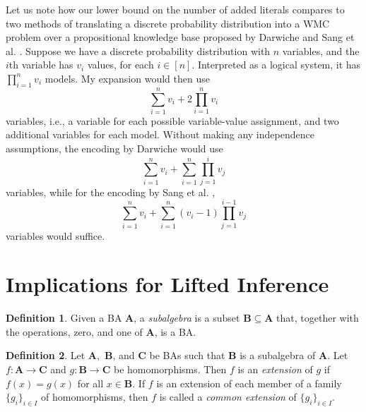\documentclass{article}
\theoremstyle{definition}
\newtheorem{definition}{Definition}
\theoremstyle{remark}
\begin{document}

Let us note how our lower bound on the number of added literals compares to two
methods of translating a discrete probability distribution into a WMC problem
over a propositional knowledge base proposed by Darwiche
\cite{DBLP:conf/kr/Darwiche02} and Sang et al. \cite{DBLP:conf/aaai/SangBK05}.
Suppose we have a discrete probability distribution with  $n$ variables, and the
$i$th variable has $v_i$ values, for each $i \in [n]$. Interpreted as a logical
system, it has $\prod_{i=1}^n v_i$ models. My expansion would then use
\[
  \sum_{i=1}^n v_i + 2\prod_{i=1}^n v_i
\]
variables, i.e., a variable for each possible variable-value assignment, and two
additional variables for each model. Without making any independence
assumptions, the encoding by Darwiche \cite{DBLP:conf/kr/Darwiche02} would use
\[
  \sum_{i=1}^n v_i + \sum_{i=1}^n \prod_{j=1}^i v_j
\]
variables, while for the encoding by Sang et al. \cite{DBLP:conf/aaai/SangBK05},
\[
  \sum_{i=1}^n v_i + \sum_{i=1}^n (v_i - 1) \prod_{j=1}^{i-1} v_j
\]
variables would suffice.

\section{Implications for Lifted Inference}

\begin{definition}
  Given a BA $\mathbf{A}$, a \emph{subalgebra} is a subset $\mathbf{B} \subseteq
  \mathbf{A}$ that, together with the operations, zero, and one of $\mathbf{A}$,
  is a BA.
\end{definition}

\begin{definition}
  Let $\mathbf{A},$ $\mathbf{B}$, and $\mathbf{C}$ be BAs such that $\mathbf{B}$
  is a subalgebra of $\mathbf{A}$. Let $f\colon \mathbf{A} \to \mathbf{C}$ and
  $g\colon \mathbf{B} \to \mathbf{C}$ be homomorphisms. Then $f$ is an
  \emph{extension} of $g$ if $f(x) = g(x)$ for all $x \in \mathbf{B}$. If $f$ is
  an extension of each member of a family $\{ g_i \}_{i \in I}$ of
  homomorphisms, then $f$ is called a \emph{common extension} of $\{ g_i \}_{i
    \in I}$.
\end{definition}
\end{document}
